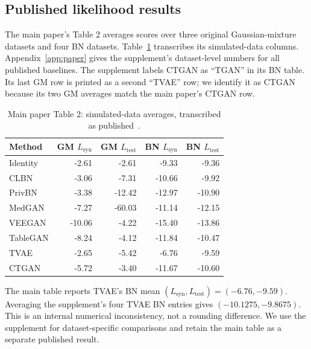 \documentclass[11pt,letterpaper]{article}
\newcommand{\Lsyn}{L_{\mathrm{syn}}}
\newcommand{\Ltest}{L_{\mathrm{test}}}
\begin{document}
\subsection{Published likelihood results}
The main paper's Table 2 averages scores over three original Gaussian-mixture datasets and four BN datasets. Table~\ref{tab:paperaverages} transcribes its simulated-data columns. Appendix~\ref{app:paper} gives the supplement's dataset-level numbers for all published baselines. The supplement labels CTGAN as ``TGAN'' in its BN table. Its last GM row is printed as a second ``TVAE'' row; we identify it as CTGAN because its two GM averages match the main paper's CTGAN row.
\begin{table}[H]\centering
\caption{Main paper Table 2: simulated-data averages, transcribed as published~\cite{xu2019}.}\label{tab:paperaverages}
\small
\begin{tabular}{lrrrr}\toprule
Method & GM $\Lsyn$ & GM $\Ltest$ & BN $\Lsyn$ & BN $\Ltest$\\\midrule
Identity & -2.61 & -2.61 & -9.33 & -9.36\\
CLBN & -3.06 & -7.31 & -10.66 & -9.92\\
PrivBN & -3.38 & -12.42 & -12.97 & -10.90\\
MedGAN & -7.27 & -60.03 & -11.14 & -12.15\\
VEEGAN & -10.06 & -4.22 & -15.40 & -13.86\\
TableGAN & -8.24 & -4.12 & -11.84 & -10.47\\
TVAE & -2.65 & -5.42 & -6.76 & -9.59\\
CTGAN & -5.72 & -3.40 & -11.67 & -10.60\\
\bottomrule\end{tabular}
\end{table}
The main table reports TVAE's BN mean $(\Lsyn,\Ltest)=(-6.76,-9.59)$. Averaging the supplement's four TVAE BN entries gives $(-10.1275,-9.8675)$. This is an internal numerical inconsistency, not a rounding difference. We use the supplement for dataset-specific comparisons and retain the main table as a separate published result.
\end{document}
